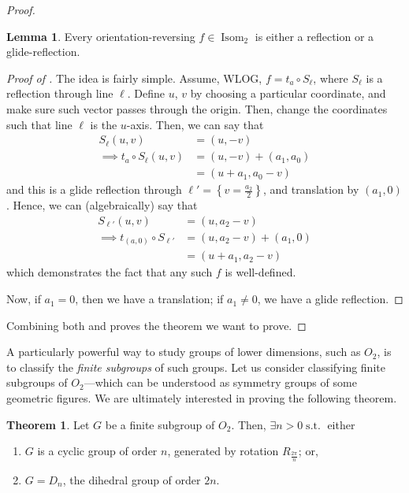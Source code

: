 \documentclass[11pt]{amsart} %
\theoremstyle{definition}
\newtheorem{theorem}[definition]{Theorem}
\newtheorem{lemma}[definition]{Lemma}
\theoremstyle{definition}
\DeclareMathOperator{\suchthat}{\text{ s.t. }}
\DeclareMathOperator{\isom}{Isom}
\numberwithin{equation}{section}
\begin{document}
\begin{proof}
	\begin{lemma}
		\label{lemmaorrefgf}
		Every orientation-reversing $f \in \isom_2$ is either a reflection or a glide-reflection.
	\end{lemma}

	\begin{proof}[Proof of ]
		The idea is fairly simple. Assume, WLOG, $f=t_a \circ S_\ell$, where $S_\ell$ is a reflection through line $\ell$. Define $u$, $v$ by choosing a particular coordinate, and make sure such vector passes through the origin. Then, change the coordinates such that line $\ell$ is the $u$-axis. Then, we can say that
		\begin{align*}
		S_{\ell} (u,v) &= (u,-v) \\
		\implies t_a \circ S_{\ell} (u,v) &= (u,-v) + (a_1, a_0) \\
		&= (u+ a_1,a_0 -v)
		\end{align*}
		and this is a glide reflection through $\ell' = \left\{ v = \frac{a_2}{2} \right\}$, and translation by $(a_1,0)$. Hence, we can (algebraically) say that
		\begin{align*}
			S_{\ell' } (u,v) &= (u,a_2-v) \\
			\implies t_{(a,0)} \circ S_{\ell'} &= (u,a_2-v) + (a_1,0) \\
			&= (u+a_1,a_2 - v)
		\end{align*}
		which demonstrates the fact that any such $f$ is well-defined.
		
		Now, if $a_1=0$, then we have a translation; if $a_1 \neq 0$, we have a glide reflection.
	\end{proof}
	
	Combining both  and  proves the theorem we want to prove.
\end{proof}

A particularly powerful way to study groups of lower dimensions, such as $O_2$, is to classify the \textit{finite subgroups} of such groups. Let us consider classifying finite subgroups of $O_2$---which can be understood as symmetry groups of some geometric figures. We are ultimately interested in proving the following theorem.

\begin{theorem}
	\label{thmclassificationfsgrpO2}
	Let $G$ be a finite subgroup of $O_2$. Then, $\exists n>0 \suchthat $ either 
	\begin{enumerate}%
		\item $G$ is a cyclic group of order $n$, generated by rotation $R_{\frac{2\pi}{n}}$; or,
		\item $G= D_n$, the dihedral group of order $2n$.
	\end{enumerate}
\end{theorem}
\end{document}
